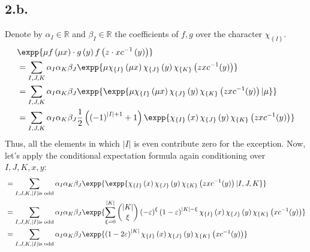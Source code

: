 \documentclass{article}
\newcommand{\Chi}[1]{\chi_{ \left\{ #1  \right\} } }
\begin{document}
\subsection{2.b.} 
Denote by $\alpha_{I} \in \mathbb{R}$ and $\beta_{I} \in \mathbb{R}$ the coefficients of $f,g$ over the character $\Chi{I}$.  
\begin{equation*}
  \begin{split}
    & \expp{\mu f\left( \mu x \right) \cdot g\left( y \right)f\left(z \cdot x c^{-1}\left( y \right)  \right)} \\
    & = \sum_{I,J,K}\alpha_{I}\alpha_{K}\beta_{J}\expp{ \mu \Chi{I}\left( \mu x \right)\Chi{J}\left( y \right) \Chi{K}\left( zx c^{-1}(y) \right) } \\
    & = \sum_{I,J,K}\alpha_{I}\alpha_{K}\beta_{J}\expp{\expp{ \mu \Chi{I}\left( \mu x \right)\Chi{J}\left( y \right) \Chi{K}\left( zx c^{-1}(y) \right)|\mu}} \\ 
    & = \sum_{I,J,K}\alpha_{I}\alpha_{K}\beta_{J}\frac{1}{2}\left( \left( - 1 \right)^{|I|+1}  + 1\right) \expp{  \Chi{I}\left(  x \right)\Chi{J}\left( y \right) \Chi{K}\left( zx c^{-1}(y) \right) }  
  \end{split}
\end{equation*}
Thus, all the elements in which $|I|$ is even contribute zero for the exception. Now, let's apply the conditional expectation formula again conditioning over $I,J,K, x,y$:   
\begin{equation*}
  \begin{split}
    &  = \sum_{I,J,K, |I| \text{is odd} }\alpha_{I}\alpha_{K}\beta_{J} \expp{\expp{ \Chi{I}\left(  x \right)\Chi{J}\left( y \right) \Chi{K}\left( zx c^{-1}(y) \right) | I,J,K }} \\  
    &  = \sum_{I,J,K, |I| \text{is odd} }\alpha_{I}\alpha_{K}\beta_{J} \expp{ \sum_{ \xi = 0}^{|K|}{ { |K| \choose \xi } \left( -\varepsilon \right)^{\xi} \left( 1 - \varepsilon \right)^{|K|- \xi} \Chi{I}\left(  x \right)\Chi{J}\left( y \right) \Chi{K}\left( x c^{-1}(y) \right) }} \\  
    &  = \sum_{I,J,K, |I| \text{is odd} }\alpha_{I}\alpha_{K}\beta_{J} \expp{ \left( 1 -2 \varepsilon \right)^{|K|} \Chi{I}\left(  x \right)\Chi{J}\left( y \right) \Chi{K}\left( x c^{-1}(y) \right) }   
  \end{split}
\end{equation*}
\end{document}
